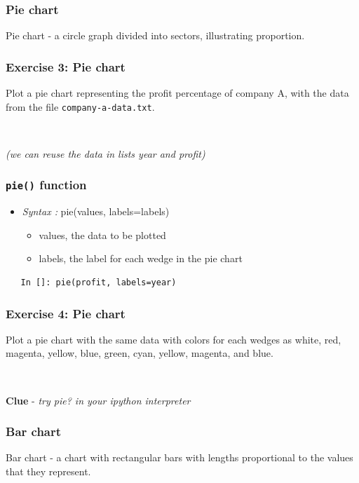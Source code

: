 \documentclass[presentation]{beamer}
\begin{document}
\begin{frame}
\frametitle{Pie chart}
\label{sec-5}

  Pie chart - a circle graph divided into sectors, illustrating proportion. 
\end{frame}
\begin{frame}[fragile]
\frametitle{Exercise 3: Pie chart}
\label{sec-6}

  Plot a pie chart representing the profit percentage of company A, with the data 
  from the file \texttt{company-a-data.txt}.
\begin{verbatim}
   
\end{verbatim}

  \emph{(we can reuse the data in lists year and profit)}
\end{frame}
\begin{frame}[fragile]
\frametitle{\texttt{pie()} function}
\label{sec-7}

\begin{itemize}
\item \emph{Syntax :} pie(values, labels=labels)

\begin{itemize}
\item values, the data to be plotted
\item labels, the label for each wedge in the pie chart
\end{itemize}

\end{itemize}

\begin{verbatim}
   In []: pie(profit, labels=year)
\end{verbatim}
\end{frame}
\begin{frame}[fragile]
\frametitle{Exercise 4: Pie chart}
\label{sec-8}

  Plot a pie chart with the same data with colors for each wedges as white, red, 
  magenta, yellow, blue, green, cyan, yellow, magenta, and blue.
\begin{verbatim}
   
\end{verbatim}

  \textbf{Clue} - \emph{try pie? in your ipython interpreter}
\end{frame}
\begin{frame}
\frametitle{Bar chart}
\label{sec-9}

  Bar chart - a chart with rectangular bars with lengths proportional 
  to the values that they represent.
\end{frame}
\end{document}
